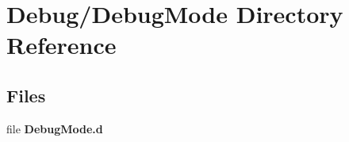 \section{Debug/\+Debug\+Mode Directory Reference}
\label{dir_41f6e655e3e9a4c62fe751569b035bdd}
\subsection*{Files}
\begin{DoxyCompactItemize}
\item 
file {\bfseries Debug\+Mode.\+d}
\end{DoxyCompactItemize}
